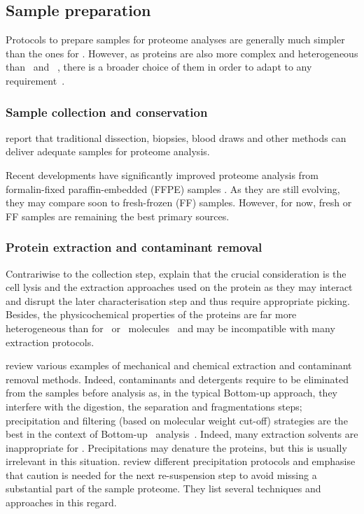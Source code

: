 \subsection{Sample preparation}\label{subsec:ProtSampPrep}
Protocols to prepare samples for proteome analyses are generally much simpler
than the ones for \Rnaseq.
However, as proteins are also more complex and heterogeneous
than \DNA\ and \RNA~, there is a broader choice of them
in order to adapt to any requirement~.\mybr\

\subsubsection{Sample collection and conservation}
\citet{Feist2015} report that traditional dissection, biopsies, blood draws and
other methods can deliver adequate samples for proteome analysis.\mybr\

Recent developments have significantly improved proteome analysis from
formalin-fixed paraffin-embedded (\gls{FFPE}) samples .
As they are still evolving,
they may compare soon to fresh-frozen (\gls{FF}) samples.
However, for now, fresh or \gls{FF} samples are remaining the best primary sources.\mybr\

\subsubsection{Protein extraction and contaminant removal}
Contrariwise to the collection step, \citet{Feist2015} explain that the crucial
consideration is the cell lysis and the extraction approaches used on
the protein as they may interact and disrupt the later characterisation step and
thus require appropriate picking. Besides, the physicochemical properties of
the proteins are far more heterogeneous than for \DNA\ or \RNA\ molecules~
and may be incompatible with many extraction protocols.\mybr\

\citet{Gutstein2008,Bodzon-Kulakowska2007,Visser2005,Hilbrig2003} review various
examples of mechanical and chemical extraction and contaminant removal methods.
Indeed, contaminants and detergents require to be eliminated from the samples
before analysis as, in the typical \gls{Bottom-up} approach, they interfere
with the digestion, the separation and fragmentations steps; precipitation and
filtering (based on molecular weight cut-off) strategies are the best in the
context of \gls{Bottom-up} \ms\ analysis~. Indeed, many
extraction solvents are inappropriate for \ms. Precipitations may denature the
proteins, but this is usually irrelevant in this situation.
\citet{Feist2015} review different precipitation protocols
and emphasise that caution is needed
for the next re-suspension step to avoid missing a substantial part of the
sample proteome. They list several techniques and approaches in this regard.\mybr\

